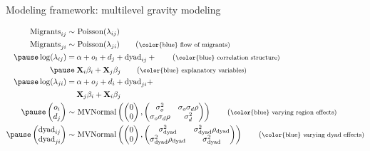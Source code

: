 \documentclass{beamer}
\begin{document}
\begin{frame}[fragile]{Modeling framework: multilevel gravity modeling}
\begin{small}
  \begin{align}
	\text{Migrants}_{ij} \sim & \text{ Poisson}(\lambda_{ij}) \notag \\
	\text{Migrants}_{ji} \sim & \text{ Poisson}(\lambda_{ji}) \tag{\footnotesize \color{blue} flow of migrants} \\ \pause
	\log(\lambda_{ij}) =  & \: \alpha + o_{i} + d_{j} + \text{dyad}_{ij} +\tag{\footnotesize
							\color{blue} correlation structure}  \\ \pause
							  & \: \mathbf{X}_{i}  \beta_{i}+ \mathbf{X}_{j} \beta_{j}  \tag{\footnotesize \color{blue} explanatory variables}  \\ \pause
	\log(\lambda_{ji}) =  & \: \alpha + o_{j} + d_{i} + \text{dyad}_{ji} + \notag \\
							  & \: \mathbf{X}_{j}  \beta_{i}+ \mathbf{X}_{i} \beta_{j} \notag  \\ \pause
	\left(\begin{matrix} 
		o_{i} \\
		d_{j}
	\end{matrix}\right) \sim& \text{ MVNormal}\left( \left( \begin{matrix}
	0 \\
	0 
	\end{matrix}\right) , \left(\begin{matrix}
	\sigma_o^2 & \sigma_o \sigma_d \rho \\
	 \sigma_o \sigma_d \rho  & \sigma_d^2
	\end{matrix}\right) \right)  \tag{\footnotesize \color{blue} varying region effects}  \\ \pause 	\left(\begin{matrix} 
		\text{dyad}_{ij} \\
		\text{dyad}_{ji}
	\end{matrix}\right) \sim& \text{ MVNormal}\left( \left( \begin{matrix}
	0 \\
	0 
	\end{matrix}\right) , \left(\begin{matrix}
	\sigma_{\text{dyad}}^2 & \sigma_{\text{dyad}}^2 \rho_{\text{dyad}} \\
	 \sigma_{\text{dyad}}^2 \rho_{\text{dyad}}  & \sigma_{\text{dyad}}^2
	\end{matrix}\right) \right)  \tag{\footnotesize \color{blue} varying dyad effects}
	\end{align}
\end{small}
\end{frame}
\end{document}

